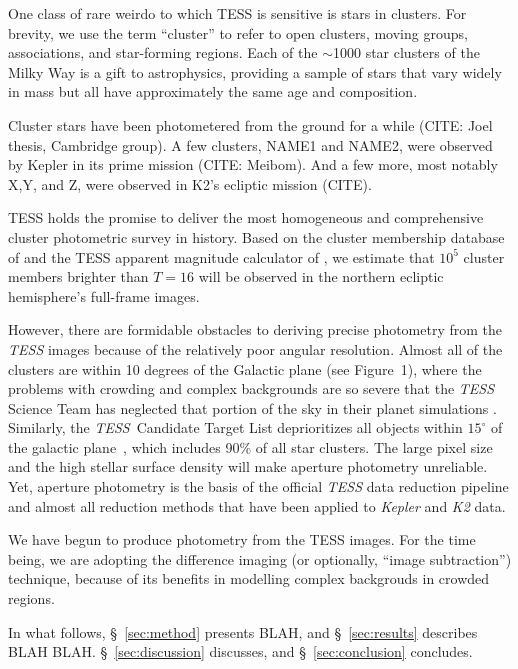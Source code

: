 \documentclass[12pt,twocolumn,tighten]{aastex62}
\begin{document}
One class of rare weirdo to which TESS is sensitive is stars in
clusters.  For brevity, we use the term ``cluster'' to refer to open
clusters, moving groups, associations, and star-forming regions.
Each of the $\sim$1000 star clusters of the Milky Way is a gift to
astrophysics, providing a sample of stars that vary widely in mass
but all have approximately the same age and composition. 

Cluster stars have been photometered from the ground for a while
(CITE: Joel thesis, Cambridge group).
A few clusters, NAME1 and NAME2, were observed by Kepler in its prime
mission (CITE: Meibom).
And a few more, most notably X,Y, and Z, were observed in K2's
ecliptic mission (CITE).

TESS holds the promise to deliver the most homogeneous and
comprehensive cluster photometric survey in history.  Based on the
cluster membership database of \citet{Kharchenko_et_al_2013} and the
TESS apparent magnitude calculator of \citet{Jaffe_Barclay_2017}, we
estimate that $10^5$ cluster members brighter than $T=16$ will be
observed in the northern ecliptic hemisphere's full-frame images.

However, there are formidable obstacles to deriving precise photometry
from the {\it TESS} images because of the relatively poor angular
resolution.  Almost all of the clusters are within 10 degrees of the
Galactic plane (see Figure~1), where the problems with crowding and
complex backgrounds are so severe that the {\it TESS}\, Science Team
has neglected that portion of the sky in their planet simulations
\citep{Sullivan_et_al_2015}. Similarly, the {\it TESS}\, Candidate
Target List deprioritizes all objects within $15^\circ$ of the
galactic plane~\citep{stassun_TIC_2018}, which includes 90\% of all
star clusters.  The large pixel size and the high stellar surface
density will make aperture photometry unreliable.  Yet, aperture
photometry is the basis of the official {\it TESS} data reduction
pipeline and almost all reduction methods that have been applied to
{\it Kepler} and {\it K2} data.


We have begun to produce photometry from the TESS images.
For the time being, we are adopting the difference imaging (or
optionally, ``image subtraction'') technique, because of its
benefits in modelling complex backgrouds in crowded regions.


In what follows, \S~\ref{sec:method} presents BLAH, and
\S~\ref{sec:results} describes BLAH BLAH.
\S~\ref{sec:discussion} discusses, and \S~\ref{sec:conclusion}
concludes.
\end{document}
